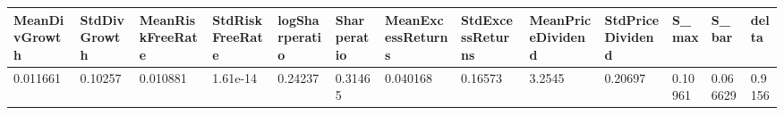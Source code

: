 \begin{tabular}{lllllllllllll}
\toprule 
MeanDivGrowth & StdDivGrowth & MeanRiskFreeRate & StdRiskFreeRate & logSharperatio & Sharperatio & MeanExcessReturns & StdExcessReturns & MeanPriceDividend & StdPriceDividend & S_max & S_bar & delta \\ 
\midrule 
0.011661 & 0.10257 & 0.010881 & 1.61e-14 & 0.24237 & 0.31465 & 0.040168 & 0.16573 & 3.2545 & 0.20697 & 0.10961 & 0.066629 & 0.9156 \\ 
\bottomrule 
\end{tabular}